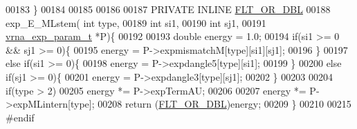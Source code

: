 \begin{DoxyCode}
00183 \}
00184 
00185 
00186 
00187 PRIVATE INLINE \hyperlink{group__data__structures_ga31125aeace516926bf7f251f759b6126}{FLT\_OR\_DBL}
00188 exp\_E\_MLstem( \textcolor{keywordtype}{int} type,
00189               \textcolor{keywordtype}{int} si1,
00190               \textcolor{keywordtype}{int} sj1,
00191               \hyperlink{group__energy__parameters_structvrna__exp__param__s}{vrna\_exp\_param\_t} *P)\{
00192 
00193   \textcolor{keywordtype}{double} energy = 1.0;
00194   \textcolor{keywordflow}{if}(si1 >= 0 && sj1 >= 0)\{
00195     energy = P->expmismatchM[type][si1][sj1];
00196   \}
00197   \textcolor{keywordflow}{else} \textcolor{keywordflow}{if}(si1 >= 0)\{
00198     energy = P->expdangle5[type][si1];
00199   \}
00200   \textcolor{keywordflow}{else} \textcolor{keywordflow}{if}(sj1 >= 0)\{
00201     energy = P->expdangle3[type][sj1];
00202   \}
00203 
00204   \textcolor{keywordflow}{if}(type > 2)
00205     energy *= P->expTermAU;
00206 
00207   energy *= P->expMLintern[type];
00208   \textcolor{keywordflow}{return} (\hyperlink{group__data__structures_ga31125aeace516926bf7f251f759b6126}{FLT\_OR\_DBL})energy;
00209 \}
00210 
00215 \textcolor{preprocessor}{#endif}
\end{DoxyCode}
